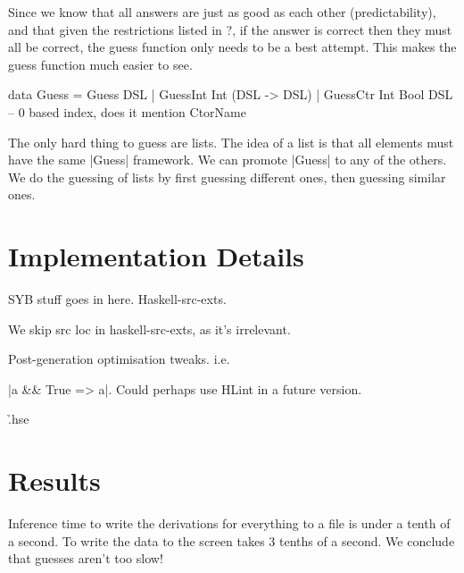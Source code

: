 \documentclass[preprint]{sigplanconf}
\begin{document}
Since we know that all answers are just as good as each other (predictability), and that given the restrictions listed in ?, if the answer is correct then they must all be correct, the guess function only needs to be a best attempt. This makes the guess function much easier to see.

\begin{code}
data Guess = Guess DSL
           | GuessInt Int (DSL -> DSL)
           | GuessCtr Int Bool DSL  -- 0 based index, does it mention CtorName
\end{code}

The only hard thing to guess are lists. The idea of a list is that all elements must have the same |Guess| framework. We can promote |Guess| to any of the others. We do the guessing of lists by first guessing different ones, then guessing similar ones.

\section{Implementation Details}
\label{sec:implementation}

SYB stuff goes in here. Haskell-src-exts.

We skip src loc in haskell-src-exts, as it's irrelevant.

Post-generation optimisation tweaks. i.e. \ignore|a && True => a|. Could perhaps use HLint in a future version.

\h{.hse}

\section{Results}
\label{sec:results}

Inference time to write the derivations for everything to a file is under a tenth of a second. To write the data to the screen takes 3 tenths of a second. We conclude that guesses aren't too slow!
\end{document}
